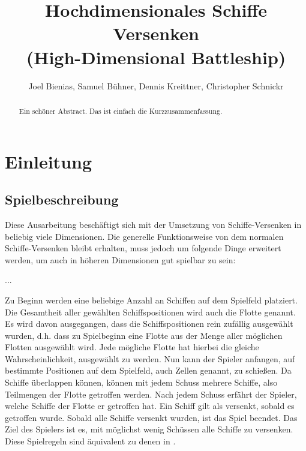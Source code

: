 \documentclass[a4paper,12pt]{llncs}
\numberwithin{equation}{section}
\begin{document}

\author{Joel Bienias, Samuel Bühner, Dennis Kreittner, Christopher Schnickr}

\title{Hochdimensionales Schiffe Versenken \\
(High-Dimensional Battleship)}

\maketitle

\thispagestyle{empty}

\begin{abstract}
Ein schöner Abstract. Das ist einfach die Kurzzusammenfassung.
\end{abstract}

\section{Einleitung}

\subsection{Spielbeschreibung}
Diese Ausarbeitung beschäftigt sich mit der Umsetzung von Schiffe-Versenken in beliebig viele Dimensionen.
Die generelle Funktionsweise von dem normalen Schiffe-Versenken bleibt erhalten, muss jedoch um folgende Dinge erweitert werden, um auch in höheren Dimensionen gut spielbar zu sein:

...

Zu Beginn werden eine beliebige Anzahl an Schiffen auf dem Spielfeld platziert.
Die Gesamtheit aller gewählten Schiffspositionen wird auch die Flotte genannt.
Es wird davon ausgegangen, dass die Schiffspositionen rein zufällig ausgewählt wurden, d.h. dass zu Spielbeginn eine Flotte aus der Menge aller möglichen Flotten ausgewählt wird. Jede mögliche Flotte hat hierbei die gleiche Wahrscheinlichkeit, ausgewählt zu werden.
Nun kann der Spieler anfangen, auf bestimmte Positionen auf dem Spielfeld, auch Zellen genannt, zu schießen.
Da Schiffe überlappen können, können mit jedem Schuss mehrere Schiffe, also Teilmengen der Flotte getroffen werden.
Nach jedem Schuss erfährt der Spieler, welche Schiffe der Flotte er getroffen hat.
Ein Schiff gilt als versenkt, sobald es getroffen wurde.
Sobald alle Schiffe versenkt wurden, ist das Spiel beendet.
Das Ziel des Spielers ist es, mit möglichst wenig Schüssen alle Schiffe zu versenken.
Diese Spielregeln sind äquivalent zu denen in \cite{}.
\end{document}
